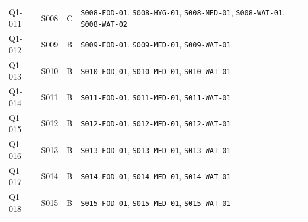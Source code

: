 \begin{longtable}{@{}llc>{\raggedright\arraybackslash}p{9.3cm}@{}}
Q1-011 & S008 & C & \texttt{S008-FOD-01}\allowbreak, \texttt{S008-HYG-01}\allowbreak, \texttt{S008-MED-01}\allowbreak, \texttt{S008-WAT-01}\allowbreak, \texttt{S008-WAT-02}\allowbreak\\
Q1-012 & S009 & B & \texttt{S009-FOD-01}\allowbreak, \texttt{S009-MED-01}\allowbreak, \texttt{S009-WAT-01}\allowbreak\\
Q1-013 & S010 & B & \texttt{S010-FOD-01}\allowbreak, \texttt{S010-MED-01}\allowbreak, \texttt{S010-WAT-01}\allowbreak\\
Q1-014 & S011 & B & \texttt{S011-FOD-01}\allowbreak, \texttt{S011-MED-01}\allowbreak, \texttt{S011-WAT-01}\allowbreak\\
Q1-015 & S012 & B & \texttt{S012-FOD-01}\allowbreak, \texttt{S012-MED-01}\allowbreak, \texttt{S012-WAT-01}\allowbreak\\
Q1-016 & S013 & B & \texttt{S013-FOD-01}\allowbreak, \texttt{S013-MED-01}\allowbreak, \texttt{S013-WAT-01}\allowbreak\\
Q1-017 & S014 & B & \texttt{S014-FOD-01}\allowbreak, \texttt{S014-MED-01}\allowbreak, \texttt{S014-WAT-01}\allowbreak\\
Q1-018 & S015 & B & \texttt{S015-FOD-01}\allowbreak, \texttt{S015-MED-01}\allowbreak, \texttt{S015-WAT-01}\allowbreak\\
\bottomrule
\end{longtable}
